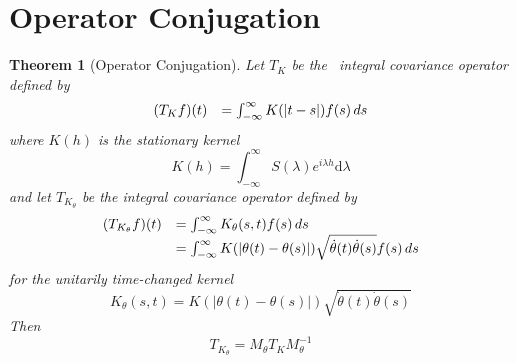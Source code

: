 \documentclass{article}
\newcommand{\mathd}{\mathrm{d}}
\newtheorem{theorem}{Theorem}
\begin{document}
\section{Operator Conjugation}\label{sec:conjugation}

\begin{theorem}
  [Operator Conjugation]\label{thm:operator_conjugation} Let $T_K$ be the \
  integral covariance operator defined by
  \begin{equation}
    \label{eq:integral_op_original} \begin{array}{ll}
      (T_K f) (t) & = \int_{- \infty}^{\infty} K (|t - s|) f (s) 
      \hspace{0.17em} ds
    \end{array}
  \end{equation}
  where $K (h)$ is the stationary kernel
  \begin{equation}
    K (h) = \int_{- \infty}^{\infty} S (\lambda) e^{i \lambda h} \mathd
    \lambda
  \end{equation}
  and let $T_{K_{\theta}}$ be the integral covariance operator defined by
  \begin{equation}
    \label{eq:integral_op_transformed} \begin{array}{ll}
      (T_{K_{\theta}} f) (t) & = \int_{- \infty}^{\infty} K_{\theta} (s, t) f
      (s)  \hspace{0.17em} ds\\
      & = \int_{- \infty}^{\infty} K (| \theta (t) - \theta (s) |) 
      \sqrt{\dot{\theta} (t) \dot{\theta} (s)} f (s)  \hspace{0.17em} ds
    \end{array}
  \end{equation}
  for the unitarily time-changed kernel
  \begin{equation}
    K_{\theta} (s, t) = K (| \theta (t) - \theta (s) |) \sqrt{\dot{\theta} (t)
    \dot{\theta} (s)}
  \end{equation}
  Then
  \begin{equation}
    \label{eq:conjugation} T_{K_{\theta}} = M_{\theta} T_K M_{\theta}^{- 1}
  \end{equation}
\end{theorem}
\end{document}
